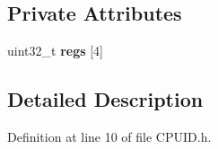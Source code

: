 \subsection*{Private Attributes}
\begin{DoxyCompactItemize}
\item 
uint32\+\_\+t {\bfseries regs} \mbox{[}4\mbox{]}\hypertarget{class_c_p_u_i_d_a3f833ee5ea4135a5604c563d25aaa7e2}{}\label{class_c_p_u_i_d_a3f833ee5ea4135a5604c563d25aaa7e2}

\end{DoxyCompactItemize}


\subsection{Detailed Description}


Definition at line 10 of file C\+P\+U\+I\+D.\+h.

